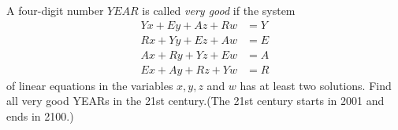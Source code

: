 \documentclass{article}
\begin{document}
\setlength{\parindent}{0pt}
A four-digit number \(\displaystyle YEAR\) is called \emph{very good} if the system
\begin{align*}
	Yx+Ey+Az+Rw &= Y \\
	Rx + Yy + Ez + Aw &= E \\
	Ax + Ry + Yz + Ew &= A \\
	Ex + Ay + Rz + Yw &= R
\end{align*}
of linear equations in the variables \(\displaystyle x,y,z\) and \(\displaystyle w\) has at least two solutions. Find all very good YEARs in the 21st century.\newline(The 21st century starts in 2001 and ends in 2100.)    
\end{document}
